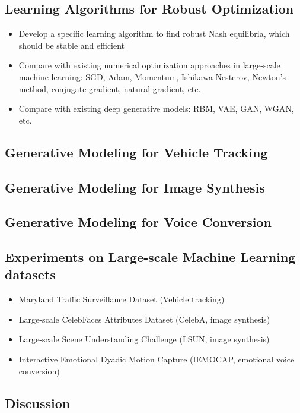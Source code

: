 \documentclass{article}
\begin{document}
\subsection{Learning Algorithms for Robust Optimization}
\begin{itemize}
\item Develop a specific learning algorithm to find robust Nash equilibria, which should be stable and efficient
\item Compare with existing numerical optimization approaches in large-scale machine learning: SGD, Adam, Momentum, Ishikawa-Nesterov, Newton's method, conjugate gradient, natural gradient, etc.
\item Compare with existing deep generative models: RBM, VAE, GAN, WGAN, etc.
\end{itemize}

\subsection{Generative Modeling for Vehicle Tracking}
\subsection{Generative Modeling for Image Synthesis}
\subsection{Generative Modeling for Voice Conversion}

\subsection{Experiments on Large-scale Machine Learning datasets}
\begin{itemize}
\item Maryland Traffic Surveillance Dataset (Vehicle tracking)
\item Large-scale CelebFaces Attributes Dataset (CelebA, image synthesis)
\item Large-scale Scene Understanding Challenge (LSUN, image synthesis)
\item Interactive Emotional Dyadic Motion Capture (IEMOCAP, emotional voice conversion)
\end{itemize}

\subsection{Discussion}
\end{document}
